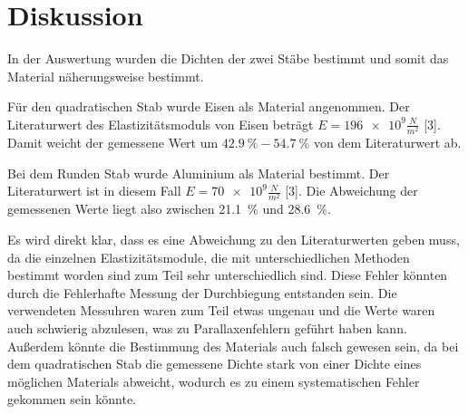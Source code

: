 \section{Diskussion}

In der Auswertung wurden die Dichten der zwei Stäbe bestimmt und somit das Material
näherungsweise bestimmt.

Für den quadratischen Stab wurde Eisen als Material angenommen. Der Literaturwert
des Elastizitätsmoduls von Eisen beträgt $E = \num{196e9} \frac{N}{m^2}$ [3]. Damit weicht der
gemessene Wert um $\SI{42.9}{\percent} - \SI{54.7}{\percent} $ von dem Literaturwert ab.

Bei dem Runden Stab wurde Aluminium als Material bestimmt. Der Literaturwert ist in diesem
Fall $E = \num{70e9} \frac{N}{m^2}$ [3]. Die Abweichung der gemessenen Werte liegt also zwischen
\SI{21.1}{\percent} und \SI{28.6}{\percent}.

Es wird direkt klar, dass es eine Abweichung zu den Literaturwerten geben muss, da
die einzelnen Elastizitätsmodule, die mit unterschiedlichen Methoden bestimmt worden
sind zum Teil sehr unterschiedlich sind.
Diese Fehler könnten durch die Fehlerhafte Messung der Durchbiegung entstanden sein.
Die verwendeten Messuhren waren zum Teil etwas ungenau und die Werte waren auch
schwierig abzulesen, was zu Parallaxenfehlern geführt haben kann.
Außerdem könnte die Bestimmung des Materials auch falsch gewesen sein, da bei dem
quadratischen Stab die gemessene Dichte stark von einer Dichte eines möglichen Materials
abweicht, wodurch es zu einem systematischen Fehler gekommen sein könnte.
